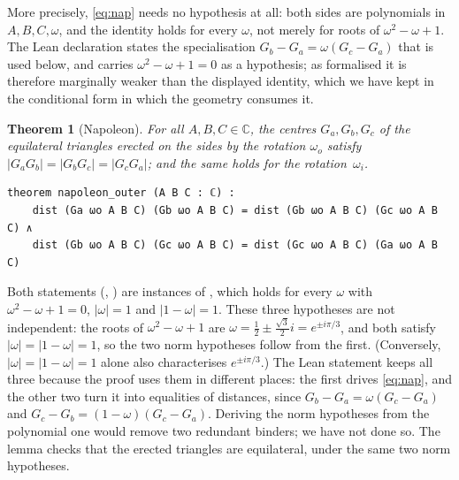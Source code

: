 \documentclass[11pt]{article}
\newtheorem{theorem}{Theorem}
\theoremstyle{definition}
\theoremstyle{remark}
\newcommand{\CC}{\mathbb{C}}
\begin{document}
More precisely, \eqref{eq:nap} needs no hypothesis at all: both sides are polynomials in
$A,B,C,\omega$, and the identity holds for every $\omega$, not merely for roots of
$\omega^2-\omega+1$. The Lean declaration  states the specialisation
$G_b-G_a=\omega(G_c-G_a)$ that is used below, and carries $\omega^2-\omega+1=0$ as a hypothesis;
as formalised it is therefore marginally weaker than the displayed identity, which we have kept in
the conditional form in which the geometry consumes it.

\begin{theorem}[Napoleon]\label{thm:napoleon}
For all $A,B,C\in\CC$, the centres $G_a,G_b,G_c$ of the equilateral triangles erected on the
sides by the rotation $\omega_o$ satisfy $|G_aG_b|=|G_bG_c|=|G_cG_a|$; and the same holds for
the rotation~$\omega_i$.
\end{theorem}

\begin{lstlisting}
theorem napoleon_outer (A B C : ℂ) :
    dist (Ga ωo A B C) (Gb ωo A B C) = dist (Gb ωo A B C) (Gc ωo A B C) ∧
    dist (Gb ωo A B C) (Gc ωo A B C) = dist (Gc ωo A B C) (Ga ωo A B C)
\end{lstlisting}

Both statements (, ) are instances of
, which holds for every $\omega$ with $\omega^2-\omega+1=0$,
$|\omega|=1$ and $|1-\omega|=1$. These three hypotheses are not independent: the roots of
$\omega^2-\omega+1$ are $\omega=\tfrac12\pm\tfrac{\sqrt3}2i=e^{\pm i\pi/3}$, and both satisfy
$|\omega|=|1-\omega|=1$, so the two norm hypotheses follow from the first. (Conversely,
$|\omega|=|1-\omega|=1$ alone also characterises $e^{\pm i\pi/3}$.) The Lean statement keeps all
three because the proof uses them in different places: the first drives \eqref{eq:nap}, and the
other two turn it into equalities of distances, since $G_b-G_a=\omega(G_c-G_a)$ and
$G_c-G_b=(1-\omega)(G_c-G_a)$. Deriving the norm hypotheses from the polynomial one would remove
two redundant binders; we have not done so. The lemma
 checks that the erected triangles are equilateral, under the
same two norm hypotheses.
\end{document}
